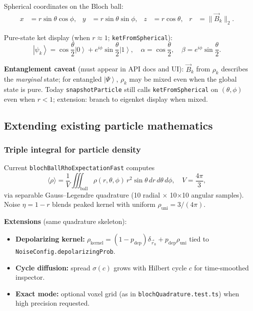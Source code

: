 \documentclass[11pt,a4paper]{article}
\newcommand{\ket}[1]{\left|#1\right\rangle}
\begin{document}
Spherical coordinates on the Bloch ball:
\begin{align}
  x &= r\sin\theta\cos\phi, &
  y &= r\sin\theta\sin\phi, &
  z &= r\cos\theta, &
  r &= \|\vec{B}_k\|_2.
\end{align}

Pure-state ket display (when $r\approx 1$; \texttt{ketFromSpherical}):
\begin{equation}
  \ket{\psi_k} = \cos\frac{\theta}{2}\ket{0} + e^{i\phi}\sin\frac{\theta}{2}\ket{1},
  \quad \alpha=\cos\frac{\theta}{2},\quad \beta=e^{i\phi}\sin\frac{\theta}{2}.
\end{equation}

\textbf{Entanglement caveat} (must appear in API docs and UI): $\vec{B}_k$ from $\rho_k$ describes the \emph{marginal} state; for entangled $\ket{\Psi}$, $\rho_k$ may be mixed even when the global state is pure. Today \texttt{snapshotParticle} still calls \texttt{ketFromSpherical} on $(\theta,\phi)$ even when $r<1$; extension: branch to eigenket display when mixed.

\subsection{Extending existing particle mathematics}

\subsubsection{Triple integral for particle density}

Current \texttt{blochBallRhoExpectationFast} computes
\begin{equation}
  \langle\rho\rangle = \frac{1}{V}\iiint_{\mathrm{ball}} \rho(r,\theta,\phi)\, r^2\sin\theta\, dr\,d\theta\,d\phi,\quad V=\frac{4\pi}{3},
\end{equation}
via separable Gauss--Legendre quadrature (10 radial $\times$ 10$\times$10 angular samples). Noise $\eta=1-r$ blends peaked kernel with uniform $\rho_{\mathrm{uni}}=3/(4\pi)$.

\textbf{Extensions} (same quadrature skeleton):
\begin{itemize}
  \item \textbf{Depolarizing kernel:} $\rho_{\mathrm{kernel}}=(1-p_{\mathrm{dep}})\delta_{\vec{r}_0}+p_{\mathrm{dep}}\rho_{\mathrm{uni}}$ tied to \texttt{NoiseConfig.depolarizingProb}.
  \item \textbf{Cycle diffusion:} spread $\sigma(c)$ grows with Hilbert cycle $c$ for time-smoothed inspector.
  \item \textbf{Exact mode:} optional voxel grid (as in \texttt{blochQuadrature.test.ts}) when high precision requested.
\end{itemize}
\end{document}
